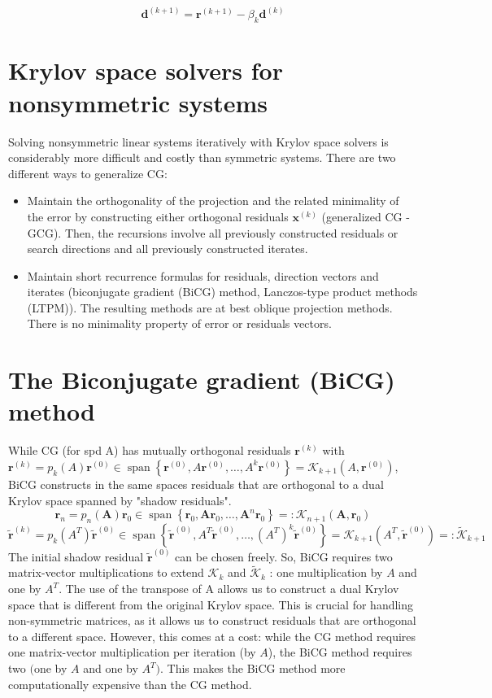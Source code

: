 \documentclass[11pt]{book}
\begin{document}
$$
\mathbf{d}^{(k+1)}=\mathbf{r}^{(k+1)}-\beta_{k} \mathbf{d}^{(k)}
$$ 
\section*{Krylov space solvers for nonsymmetric systems}
Solving nonsymmetric linear systems iteratively with Krylov space solvers is considerably more difficult and costly than symmetric systems. There are two different ways to generalize CG:
\begin{itemize}
  \item Maintain the orthogonality of the projection and the related minimality of the error by constructing either orthogonal residuals $\mathbf{x}^{(k)}$ (generalized CG - GCG). Then, the recursions involve all previously constructed residuals or search directions and all previously constructed iterates.\\
  \item Maintain short recurrence formulas for residuals, direction vectors and iterates (biconjugate gradient (BiCG) method, Lanczos-type product methods (LTPM)). The resulting methods are at best oblique projection methods. There is no minimality property of error or residuals vectors.\\
\end{itemize}

\section*{The Biconjugate gradient (BiCG) method}
While CG (for spd A) has mutually orthogonal residuals $\mathbf{r}^{(k)}$ with $\mathbf{r}^{(k)}=p_{k}(A) \mathbf{r}^{(0)} \in \operatorname{span}\left\{\mathbf{r}^{(0)}, A \mathbf{r}^{(0)}, \ldots, A^{k} \mathbf{r}^{(0)}\right\}=\mathscr{K}_{k+1}\left(A, \mathbf{r}^{(0)}\right)$, BiCG constructs in the same spaces residuals that are orthogonal to a dual Krylov space spanned by "shadow residuals".
$$\mathbf{r}_n=p_n(\mathbf{A}) \mathbf{r}_0 \in \operatorname{span}\left\{\mathbf{r}_0, \mathbf{A r}_0, \ldots, \mathbf{A}^n \mathbf{r}_0\right\}=: \mathcal{K}_{n+1}\left(\mathbf{A}, \mathbf{r}_0\right)$$
$$
\tilde{\mathbf{r}}^{(k)}=p_{k}\left(A^{T}\right) \tilde{\mathbf{r}}^{(0)} \in \operatorname{span}\left\{\tilde{\mathbf{r}}^{(0)}, A^{T} \tilde{\mathbf{r}}^{(0)}, \ldots,\left(A^{T}\right)^{k} \tilde{\mathbf{r}}^{(0)}\right\}=\mathscr{K}_{k+1}\left(A^{T}, \tilde{\mathbf{r}}^{(0)}\right) =: \tilde{\mathscr{K}}_{k+1}
$$
The initial shadow residual $\tilde{\mathbf{r}}^{(0)}$ can be chosen freely. So, BiCG requires two matrix-vector multiplications to extend $\mathscr{K}_{k}$ and $\tilde{\mathscr{K}}_{k}$ : one multiplication by $A$ and one by $A^{T}$. 
The use of the transpose of A allows us to construct a dual Krylov space that is different from the original Krylov space. This is crucial for handling non-symmetric matrices, as it allows us to construct residuals that are orthogonal to a different space.
However, this comes at a cost: while the CG method requires one matrix-vector multiplication per iteration (by $A$), the BiCG method requires two $\bigl( $one by $A$ and one by $A^T \bigl)$. This makes the BiCG method more computationally expensive than the CG method.
\end{document}
